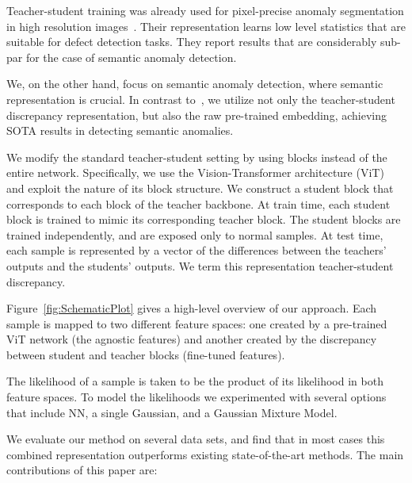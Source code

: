 \documentclass[10pt,twocolumn,letterpaper]{article}
\begin{document}
Teacher-student training was already used for pixel-precise anomaly segmentation in high resolution images~\cite{bergmann2020uninformed}. Their representation learns low level statistics that are suitable for defect detection tasks. They report results that are considerably sub-par for the case of semantic anomaly detection.



We, on the other hand, focus on semantic anomaly detection, where semantic representation is crucial. In contrast to~\cite{bergmann2020uninformed}, we utilize not only the teacher-student discrepancy representation, but also the raw pre-trained embedding, achieving SOTA results in detecting semantic anomalies. 



We modify the standard teacher-student setting by using blocks instead of the entire network. Specifically, we use the Vision-Transformer architecture (ViT) and exploit the nature of its block structure. We construct a student block that corresponds to each block of the teacher backbone. At train time, each student block is trained to mimic its corresponding teacher block. The student blocks are trained independently, and are exposed only to normal samples. At test time, each sample is represented by a vector of the differences between the teachers' outputs and the students' outputs. We term this representation teacher-student discrepancy. 


Figure~\ref{fig:SchematicPlot} gives a high-level overview of our approach. Each sample is mapped to two different feature spaces: one created by a pre-trained ViT network (the agnostic features) and another created by the discrepancy between student and teacher blocks (fine-tuned features). 

The likelihood of a sample is taken to be the product of its likelihood in both feature spaces. To model the likelihoods we experimented with several options that include NN, a single Gaussian, and a Gaussian Mixture Model. 

We evaluate our method on several data sets, and find that in most cases this combined representation outperforms existing state-of-the-art methods. The main contributions of this paper are:
\end{document}

